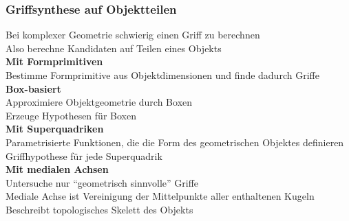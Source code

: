 \subsubsection{Griffsynthese auf Objektteilen}
Bei komplexer Geometrie schwierig einen Griff zu berechnen\\
Also berechne Kandidaten auf Teilen eines Objekts\\

\textbf{Mit Formprimitiven}\\
Bestimme Formprimitive aus Objektdimensionen und finde dadurch Griffe\\

\textbf{Box-basiert}\\
Approximiere Objektgeometrie durch Boxen\\
Erzeuge Hypothesen für Boxen\\

\textbf{Mit Superquadriken}\\
Parametrisierte Funktionen, die die Form des geometrischen Objektes definieren\\
Griffhypothese für jede Superquadrik\\

\textbf{Mit medialen Achsen}\\
Untersuche nur \enquote{geometrisch sinnvolle} Griffe\\
Mediale Achse ist Vereinigung der Mittelpunkte aller enthaltenen Kugeln\\
Beschreibt topologisches Skelett des Objekts\\


